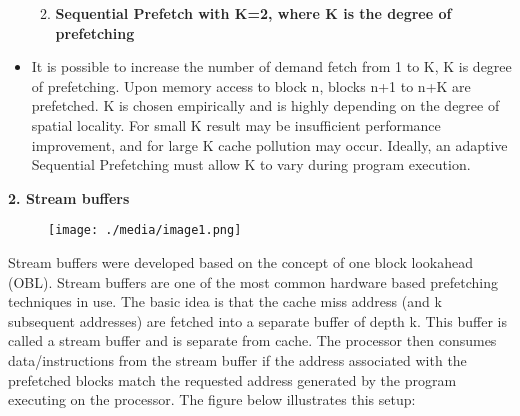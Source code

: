 \documentclass[12pt]{article}
\begin{document}
\begin{itemize}
\begin{enumerate}
\vspace{\baselineskip}
	\item {\fontsize{15pt}{18.0pt}\selectfont \textbf{\textcolor[HTML]{222222}{Sequential Prefetch with K=2, where K is the degree of prefetching }}\par}
\end{enumerate}\par

	\item {\fontsize{15pt}{18.0pt}\selectfont \textcolor[HTML]{222222}{It is possible to increase the number of demand fetch from 1 to K, K is degree of prefetching. Upon memory access to block n, blocks n+1 to n+K are prefetched. K is chosen empirically and is highly depending on the degree of spatial locality. For small K result may be insufficient performance improvement, and for large K cache pollution may occur. Ideally, an adaptive Sequential Prefetching must allow K to vary during program execution.}\par}
\end{itemize}\par


\vspace{\baselineskip}
{\fontsize{18pt}{21.6pt}\selectfont \textbf{\textcolor[HTML]{222222}{2. Stream buffers}}\par}\par


\vspace{\baselineskip}



\begin{figure}[H]
	\begin{Center}
		\texttt{[image: ./media/image1.png]}
	\end{Center}
\end{figure}



{\fontsize{15pt}{18.0pt}\selectfont \textcolor[HTML]{222222}{Stream buffers were developed based on the concept of one block lookahead (OBL). Stream buffers are one of the most common hardware based prefetching techniques in use. The basic idea is that the cache miss address (and k subsequent addresses) are fetched into a separate buffer of depth k. This buffer is called a stream buffer and is separate from cache. The processor then consumes data/instructions from the stream buffer if the address associated with the prefetched blocks match the requested address generated by the program executing on the processor. The figure below illustrates this setup:}\par}\par
\end{document}

